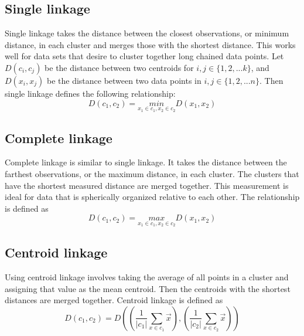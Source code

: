 \documentclass[../tech_report_1.tex]{subfiles}
\begin{document}
\subsection{Single linkage}

Single linkage takes the distance between the closest observations,
or minimum distance, in each cluster and merges those with the
shortest distance. This works well for data sets that desire to cluster
together long chained data points. Let $D(c_i,c_j)$ be the distance between two centroids for $i,j \in \{1, 2, ... k\}$, and $D(x_i, x_j)$ be the distance between two data points in $i, j \in \{ 1, 2, ... n \}$. Then single linkage defines the following relationship:
\begin{equation}
D(c_{1},c_{2})=\underset{x_{1}\in c_{1},x_{2}\in c_{2}}{min}D(x_{1},x_{2})
\end{equation}



\subsection{Complete linkage}

Complete linkage is similar to single linkage. It takes the distance
between the farthest observations, or the maximum distance, in each
cluster. The clusters that have the shortest measured distance are
merged together. This measurement is ideal for data that is spherically
organized relative to each other. The relationship is defined as
\begin{equation}
D(c_{1},c_{2})=\underset{x_{1}\in c_{1},x_{2}\in c_{2}}{max}D(x_{1},x_{2})
\end{equation}



\subsection{Centroid linkage}

Using centroid linkage involves taking the average of all points in
a cluster and assigning that value as the mean centroid. Then
the centroids with the shortest distances are merged together.
Centroid linkage is defined as
\begin{equation}
D(c_{1},c_{2})
=
D\left(
  \left(\frac{1}{|c_{1}|}\sum_{x\in c_{1}}\overset{\rightarrow}{x}\right),
  \left(\frac{1}{|c_{2}|}\sum_{x\in c_{2}}\overset{\rightarrow}{x}\right)
\right)
\end{equation}
\end{document}
